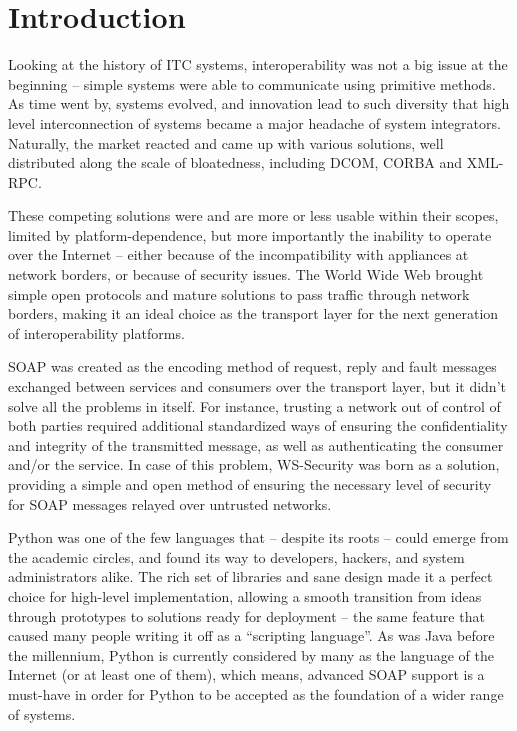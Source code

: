 
\chapter*{Introduction}


Looking at the history of ITC systems, interoperability was not a big issue at the beginning -- simple systems were able to communicate using primitive methods. As time went by, systems evolved, and innovation lead to such diversity that high level interconnection of systems became a major headache of system integrators. Naturally, the market reacted and came up with various solutions, well distributed along the scale of bloatedness, including DCOM, CORBA and XML-RPC.

These competing solutions were and are more or less usable within their scopes, limited by platform-dependence, but more importantly the inability to operate over the Internet -- either because of the incompatibility with appliances at network borders, or because of security issues. The World Wide Web brought simple open protocols and mature solutions to pass traffic through network borders, making it an ideal choice as the transport layer for the next generation of interoperability platforms.

SOAP was created as the encoding method of request, reply and fault messages exchanged between services and consumers over the transport layer, but it didn't solve all the problems in itself. For instance, trusting a network out of control of both parties required additional standardized ways of ensuring the confidentiality and integrity of the transmitted message, as well as authenticating the consumer and/or the service. In case of this problem, WS\hyp{}Security was born as a solution, providing a simple and open method of ensuring the necessary level of security for SOAP messages relayed over untrusted networks.

Python was one of the few languages that -- despite its roots -- could emerge from the academic circles, and found its way to developers, hackers, and system administrators alike. The rich set of libraries and sane design made it a perfect choice for high-level implementation, allowing a smooth transition from ideas through prototypes to solutions ready for deployment -- the same feature that caused many people writing it off as a ``scripting language''. As was Java before the millennium, Python is currently considered by many as the language of the Internet (or at least one of them), which means, advanced SOAP support is a must-have in order for Python to be accepted as the foundation of a wider range of systems.

